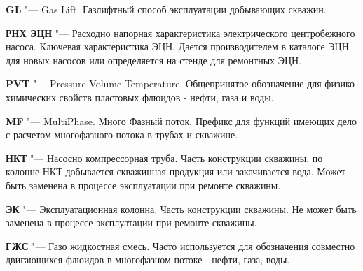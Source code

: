 \textbf{GL} "--- Gas Lift. Газлифтный способ эксплуатации добывающих скважин. 

\textbf{РНХ ЭЦН} "--- Расходно напорная характеристика электрического центробежного насоса. Ключевая характеристика ЭЦН. Дается производителем в каталоге ЭЦН для новых насосов или определяется на стенде для ремонтных ЭЦН. 

\textbf{PVT} "--- Pressure Volume Temperature. Общепринятое обозначение для физико-химических свойств пластовых флюидов - нефти, газа и воды.

\textbf{MF} "--- MultiPhase. Много Фазный поток. Префикс для функций имеющих дело с расчетом многофазного потока в трубах и скважине.

\textbf{НКТ} "--- Насосно компрессорная труба. Часть конструкции скважины. по колонне НКТ добывается скважинная продукция или закачивается вода. Может быть заменена в процессе эксплуатации при ремонте скважины. 

\textbf{ЭК} "--- Эксплуатационная колонна. Часть конструкции скважины.  Не может быть заменена в процессе эксплуатации при ремонте скважины. 

\textbf{ГЖС} "--- Газо жидкостная смесь. Часто используется для обозначения совместно двигающихся флюидов в многофазном потоке - нефти, газа, воды.

